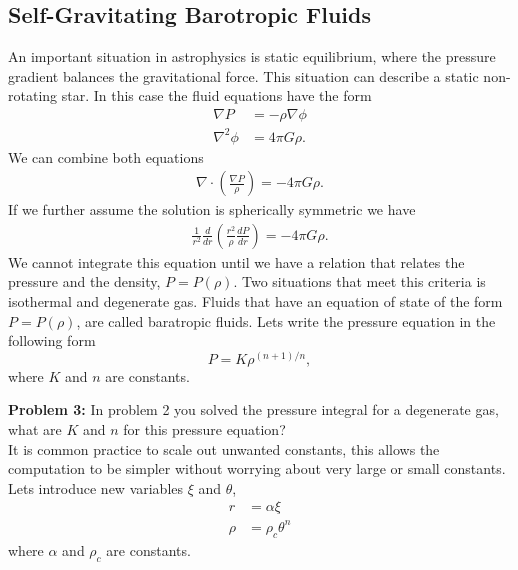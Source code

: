 \documentclass{article}
\begin{document}
\subsection{Self-Gravitating Barotropic Fluids}
An important situation in astrophysics is static equilibrium, where the pressure gradient balances the gravitational force. This situation can describe a static non-rotating star. In this case the fluid equations have the form
\begin{align*}
\nabla P & = -\rho \nabla \phi\\
\nabla^2 \phi & = 4\pi G\rho.
\end{align*}
We can combine both equations
\begin{align*}
\nabla\cdot \left(\frac{\nabla P}{\rho} \right)= -4\pi G\rho.
\end{align*}
If we further assume the solution is spherically symmetric we have
\begin{align}
\label{Eq. Balance equaution}
\frac{1}{r^2}\frac{d}{dr}\left(\frac{r^2}{\rho}\frac{dP}{dr}\right) = -4\pi G\rho.
\end{align}
We cannot integrate this equation until we have a relation that relates the pressure and the density, $P=P\left(\rho\right)$. Two situations that meet this criteria is isothermal and degenerate gas. Fluids that have an equation of state of the form $P=P\left(\rho\right)$, are called baratropic fluids. Lets write the pressure equation in the following form
\begin{equation}
\label{Eq. Barotropic}
P = K \rho^{(n+1)/n},
\end{equation}
where $K$ and $n$ are constants.

\bigskip
\noindent
\textbf{Problem 3:}
In problem 2 you solved the pressure integral for a degenerate gas, what are $K$ and $n$ for this pressure equation?\\

 It is common practice to scale out unwanted constants, this allows the computation to be simpler without worrying about very large or small constants. Lets introduce new variables $\xi$ and $\theta$,
\begin{align*}
r & = \alpha \xi\\ %
\rho & = \rho_c \theta^n %
\end{align*}
where $\alpha$ and $\rho_c$ are constants.
\end{document}
